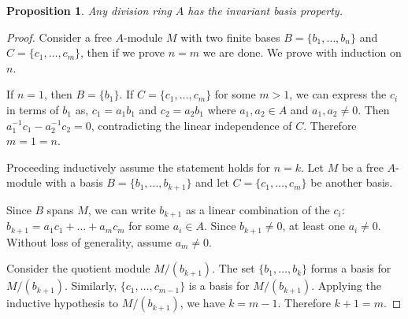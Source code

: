 \documentclass[12pt]{report}
\numberwithin{equation}{section}
\newcounter{dummy} \numberwithin{dummy}{section}
\newtheorem{proposition}[dummy]{Proposition}
\begin{document}
	\begin{proposition}\label{skewfieldsibp}
		Any division ring $A$ has the invariant basis property.
	\end{proposition}
	\begin{proof}
		Consider a free $A$-module $M$ with two finite bases $B = \{b_1, \dots, b_n\}$ and $C = \{c_1, \dots, c_m\}$, then if we prove $n=m$ we are done. We prove with induction on $n$.
		
		If $n=1$, then $B = \{b_1\}$. If $C = \{c_1, \dots, c_m\}$ for some $m>1$, we can express the $c_i$ in terms of $b_1$ as, $c_1 = a_1 b_1$ and $c_2 = a_2 b_1$ where $a_1, a_2 \in A$ and $a_1, a_2 \neq 0$. Then $a_1^{-1}c_1 - a_2^{-1}c_2 = 0$, contradicting the linear independence of $C$. Therefore $m=1=n$.
		
		Proceeding inductively assume the statement holds for $n=k$. 
		Let $M$ be a free $A$-module with a basis $B = \{b_1, \dots, b_{k+1}\}$ and let $C = \{c_1, \dots, c_m\}$ be another basis. 
		
		Since $B$ spans $M$, we can write $b_{k+1}$ as a linear combination of the $c_i$: $b_{k+1} = a_1 c_1 + \dots + a_m c_m$ for some $a_i \in A$. Since $b_{k+1} \neq 0$, at least one $a_i \neq 0$. Without loss of generality, assume $a_m \neq 0$.
		
		Consider the quotient module $M/(b_{k+1})$. The set $\{b_1, \dots, b_k\}$ forms a basis for $M/(b_{k+1})$. Similarly, $\{c_1, \dots, c_{m-1}\}$ is a basis for $M/(b_{k+1})$.  Applying the inductive hypothesis to $M/(b_{k+1})$, we have $k = m-1$.  Therefore $k+1 = m$.
	\end{proof}
	
\end{document}
